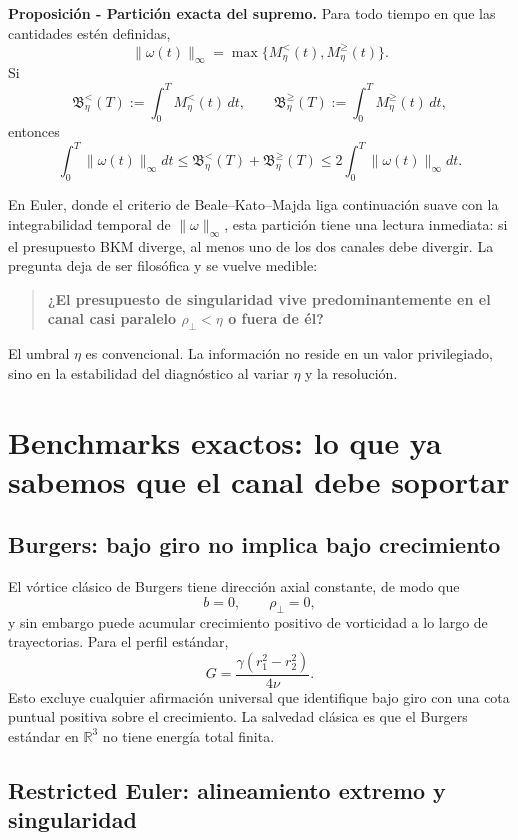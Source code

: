 \documentclass[11pt]{article}
\newcommand{\rhoT}{\rho_{\perp}}
\newenvironment{statusbox}{\begin{mdframed}[backgroundcolor=boxbg,linecolor=rule,linewidth=0.6pt,roundcorner=2pt,innerleftmargin=10pt,innerrightmargin=10pt,innertopmargin=8pt,innerbottommargin=8pt]}{\end{mdframed}}
\begin{document}
\begin{statusbox}
\textbf{Proposición - Partición exacta del supremo.} Para todo tiempo en que las cantidades estén definidas,
\[
\boxed{\|\omega(t)\|_\infty
=\max\{M_\eta^{<}(t),M_\eta^{\ge}(t)\}.}
\]
Si
\[
\mathfrak B_\eta^{<}(T):=\int_0^T M_\eta^{<}(t)\,dt,
\qquad
\mathfrak B_\eta^{\ge}(T):=\int_0^T M_\eta^{\ge}(t)\,dt,
\]
entonces
\[
\int_0^T\|\omega(t)\|_\infty dt
\le
\mathfrak B_\eta^{<}(T)+\mathfrak B_\eta^{\ge}(T)
\le
2\int_0^T\|\omega(t)\|_\infty dt.
\]
\end{statusbox}

En Euler, donde el criterio de Beale--Kato--Majda liga continuación suave con la integrabilidad temporal de $\|\omega\|_\infty$, esta partición tiene una lectura inmediata: si el presupuesto BKM diverge, al menos uno de los dos canales debe divergir. La pregunta deja de ser filosófica y se vuelve medible:

\begin{quote}
\textbf{¿El presupuesto de singularidad vive predominantemente en el canal casi paralelo $\rhoT<\eta$ o fuera de él?}
\end{quote}

El umbral $\eta$ es convencional. La información no reside en un valor privilegiado, sino en la estabilidad del diagnóstico al variar $\eta$ y la resolución.

\section{Benchmarks exactos: lo que ya sabemos que el canal debe soportar}

\subsection{Burgers: bajo giro no implica bajo crecimiento}

El vórtice clásico de Burgers tiene dirección axial constante, de modo que
\[
b=0,\qquad \rhoT=0,
\]
y sin embargo puede acumular crecimiento positivo de vorticidad a lo largo de trayectorias. Para el perfil estándar,
\[
G=\frac{\gamma(r_1^2-r_2^2)}{4\nu}.
\]
Esto excluye cualquier afirmación universal que identifique bajo giro con una cota puntual positiva sobre el crecimiento. La salvedad clásica es que el Burgers estándar en $\mathbb R^3$ no tiene energía total finita.

\subsection{Restricted Euler: alineamiento extremo y singularidad}
\end{document}
